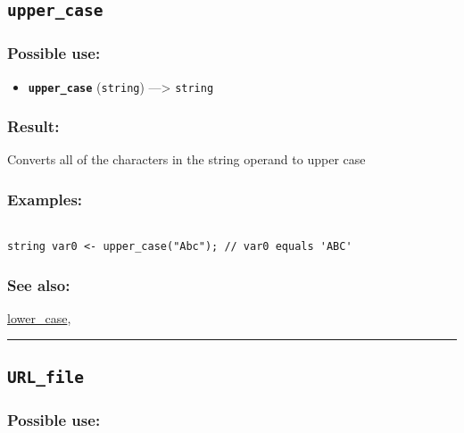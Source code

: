 \documentclass[]{book}
\providecommand{\tightlist}{%
  \setlength{\itemsep}{0pt}\setlength{\parskip}{0pt}}
\theoremstyle{definition}
\theoremstyle{definition}
\theoremstyle{definition}
\theoremstyle{remark}
\begin{document}
\subsection{\texorpdfstring{\texttt{upper\_case}}{upper\_case}}\label{upper_case}

\subsubsection{Possible use:}\label{possible-use-543}

\begin{itemize}
\tightlist
\item
  \textbf{\texttt{upper\_case}} (\texttt{string}) ---\textgreater{}
  \texttt{string}
\end{itemize}

\subsubsection{Result:}\label{result-523}

Converts all of the characters in the string operand to upper case

\subsubsection{Examples:}\label{examples-375}

\begin{verbatim}
 
string var0 <- upper_case("Abc"); // var0 equals 'ABC'
\end{verbatim}

\subsubsection{See also:}\label{see-also-215}

\href{OperatorsIM\#lower_case}{lower\_case},

\begin{center}\rule{0.5\linewidth}{\linethickness}\end{center}

\subsection{\texorpdfstring{\texttt{URL\_file}}{URL\_file}}\label{url_file}

\subsubsection{Possible use:}\label{possible-use-544}
\end{document}
